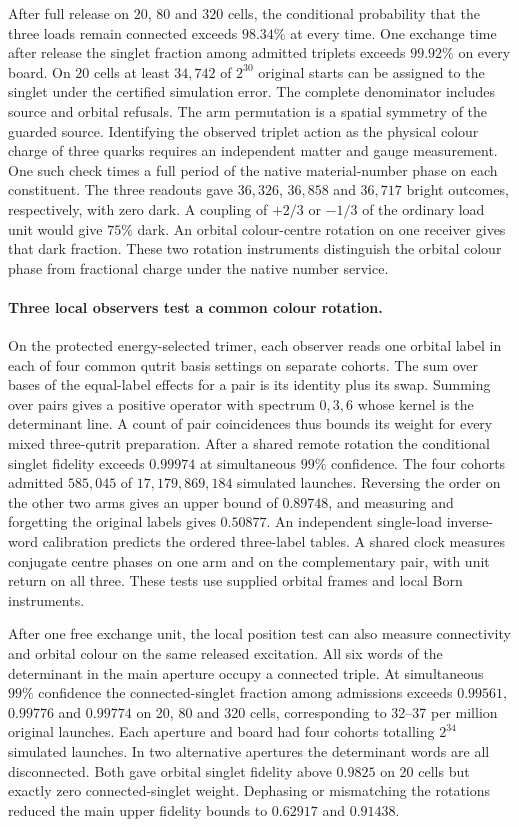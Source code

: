 \documentclass[11pt]{article}
\theoremstyle{definition}
\theoremstyle{remark}
\theoremstyle{plain}
\begin{document}
After full release on $20$, $80$ and $320$ cells, the conditional
probability that the three loads remain connected exceeds $98.34\%$
at every time. One exchange time after release the singlet fraction
among admitted triplets exceeds $99.92\%$ on every board. On $20$
cells at least $34{,}742$ of $2^{30}$ original starts can be assigned
to the singlet under the certified simulation error. The complete
denominator includes source and orbital refusals. The arm permutation
is a spatial symmetry of the guarded source. Identifying the observed
triplet action as the physical colour charge of three quarks requires
an independent matter and gauge measurement. One such check times a
full period of the native material-number phase on each constituent.
The three readouts gave $36{,}326$, $36{,}858$ and $36{,}717$ bright
outcomes, respectively, with zero dark. A coupling of $+2/3$ or
$-1/3$ of the ordinary load unit would give $75\%$ dark. An orbital
colour-centre rotation on one receiver gives that dark fraction.
These two rotation instruments distinguish the orbital colour phase
from fractional charge under the native number service.

\paragraph{Three local observers test a common colour rotation.}
On the protected energy-selected trimer, each observer reads one orbital
label in each of four common qutrit basis settings on separate cohorts.
The sum over bases of the equal-label effects for a pair is its identity
plus its swap. Summing over pairs gives a positive operator with spectrum
$0,3,6$ whose kernel is the determinant line. A count of pair coincidences
thus bounds its weight for every mixed three-qutrit preparation.
After a shared remote rotation the conditional singlet fidelity exceeds
$0.99974$ at simultaneous $99\%$ confidence. The four cohorts admitted
$585{,}045$ of $17{,}179{,}869{,}184$ simulated launches. Reversing
the order on the other two arms gives an upper bound of $0.89748$,
and measuring and forgetting the original labels gives $0.50877$.
An independent single-load inverse-word calibration predicts the ordered
three-label tables. A shared clock measures conjugate centre phases on
one arm and on the complementary pair, with unit return on all three.
These tests use supplied orbital frames and local Born instruments.

After one free exchange unit, the local position test can also measure
connectivity and orbital colour on the same released excitation. All six
words of the determinant in the main aperture occupy a connected triple.
At simultaneous $99\%$ confidence the connected-singlet fraction among
admissions exceeds $0.99561$, $0.99776$ and $0.99774$ on 20, 80 and
320 cells, corresponding to 32--37 per million original launches. Each
aperture and board had four cohorts totalling $2^{34}$ simulated launches.
In two alternative apertures the determinant words are all disconnected.
Both gave orbital singlet fidelity above $0.9825$ on 20 cells but exactly
zero connected-singlet weight. Dephasing or mismatching the rotations
reduced the main upper fidelity bounds to $0.62917$ and $0.91438$.
\end{document}
